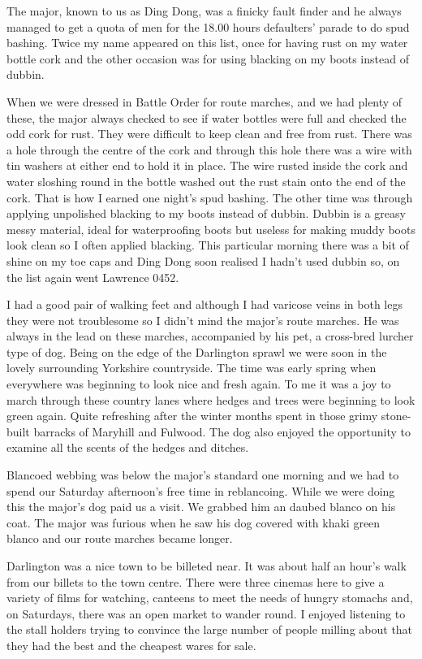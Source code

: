 The major, known to us as Ding Dong, was a finicky fault finder and he
always managed to get a quota of men for the 18.00 hours defaulters'
parade to do spud bashing. Twice my name appeared on this list, once
for having rust on my water bottle cork and the other occasion was for
using blacking on my boots instead of dubbin.

When we were dressed in Battle Order for route marches, and we had
plenty of these, the major always checked to see if water bottles were
full and checked the odd cork for rust. They were difficult to keep
clean and free from rust. There was a hole through the centre of the
cork and through this hole there was a wire with tin washers at either
end to hold it in place. The wire rusted inside the cork and water
sloshing round in the bottle washed out the rust stain onto the end of
the cork. That is how I earned one night's spud bashing. The other
time was through applying unpolished blacking to my boots instead of
dubbin. Dubbin is a greasy messy material, ideal for waterproofing
boots but useless for making muddy boots look clean so I often applied
blacking. This particular morning there was a bit of shine on my toe
caps and Ding Dong soon realised I hadn't used dubbin so, on the list
again went Lawrence 0452.

I had a good pair of walking feet and although I had varicose veins in
both legs they were not troublesome so I didn't mind the major's route
marches. He was always in the lead on these marches, accompanied by
his pet, a cross-bred lurcher type of dog. Being on the edge of the
Darlington sprawl we were soon in the lovely surrounding Yorkshire
countryside. The time was early spring when everywhere was beginning
to look nice and fresh again. To me it was a joy to march through
these country lanes where hedges and trees were beginning to look
green again. Quite refreshing after the winter months spent in those
grimy stone-built barracks of Maryhill and Fulwood. The dog also
enjoyed the opportunity to examine all the scents of the hedges and
ditches.

Blancoed webbing was below the major's standard one morning and we had
to spend our Saturday afternoon's free time in reblancoing. While we
were doing this the major's dog paid us a visit. We grabbed him an
daubed blanco on his coat. The major was furious when he saw his dog
covered with khaki green blanco and our route marches became longer.

Darlington was a nice town to be billeted near. It was about half an
hour's walk from our billets to the town centre. There were three
cinemas here to give a variety of films for watching, canteens to meet
the needs of hungry stomachs and, on Saturdays, there was an open
market to wander round. I enjoyed listening to the stall holders
trying to convince the large number of people milling about that they
had the best and the cheapest wares for sale. 

